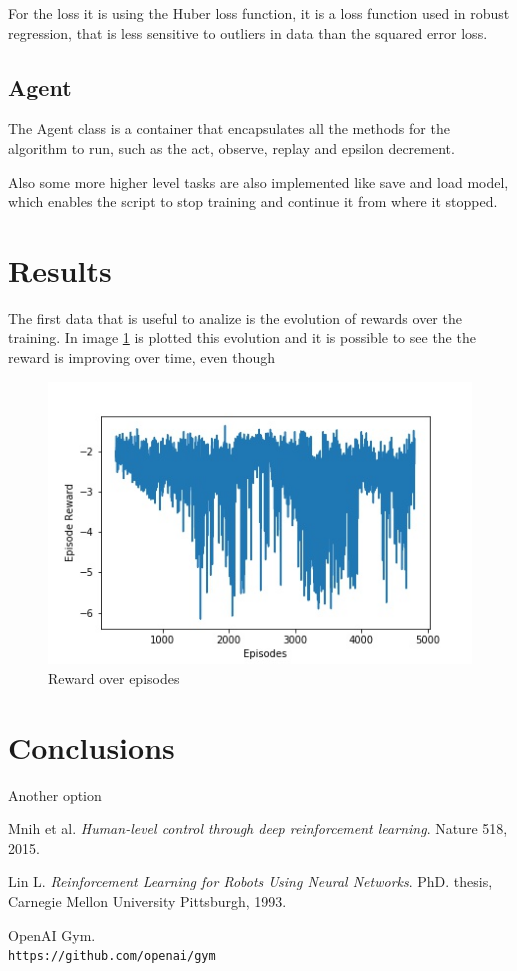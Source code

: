 \documentclass{article}
\begin{document}
For the loss it is using the Huber loss function, it is a loss function used in robust regression, that is less sensitive to outliers in data than the squared error loss.

\subsection{Agent}
The Agent class is a container that encapsulates all the methods for the algorithm to run, such as the act, observe, replay and epsilon decrement.

Also some more higher level tasks are also implemented like save and load model, which enables the script to stop training and continue it from where it stopped.

\section{Results}
The first data that is useful to analize is the evolution of rewards over the training. In image \ref{fig:fig2} is plotted this evolution and it is possible to see the the reward is improving over time, even though

\begin{figure}[h]
\centering
\includegraphics[scale=0.5]{rewardOverEpisodes}
\caption{Reward over episodes}
\label{fig:fig2}
\end{figure}

\section{Conclusions}
Another option 

\begin{thebibliography}{9}

Mnih et al.
\textit{Human-level control through deep reinforcement learning}. 
Nature 518, 2015.

Lin L.
\textit{Reinforcement Learning for Robots Using Neural Networks}. 
PhD. thesis, Carnegie Mellon University Pittsburgh, 1993.

OpenAI Gym.
\\\texttt{https://github.com/openai/gym}

\end{thebibliography}
\end{document}
